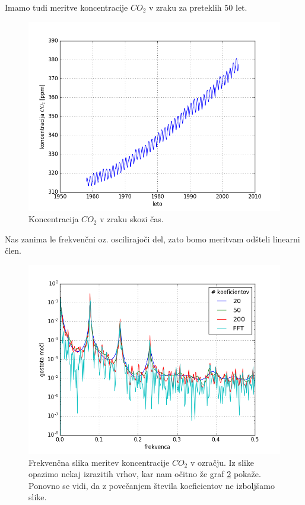 \documentclass[slovene,11pt,a4paper]{article}
\numberwithin{equation}{section} %
\numberwithin{figure}{section} %
\numberwithin{table}{section} %
\begin{document}
Imamo tudi meritve koncentracije $CO_2$ v zraku za preteklih $50$ let.
\begin{figure}[!htb]
\label{slika-co2}
\centering
\includegraphics[scale=0.5]{slike/co2_koncentracija.png}
\caption{Koncentracija $CO_2$ v zraku skozi čas.}
\end{figure}
Nas zanima le frekvenčni oz. oscilirajoči del, zato bomo meritvam odšteli linearni člen.

\begin{figure}[!htb]
\label{slika-co2}
\centering
\includegraphics[scale=0.5]{slike/co2_primerjava_koef.png}
\caption{Frekvenčna slika meritev koncentracije $CO_2$ v ozračju. Iz slike opazimo nekaj izrazitih vrhov, kar nam očitno že graf \ref{slika-co2} pokaže. Ponovno se vidi, da z povečanjem števila koeficientov ne izboljšamo slike.}
\end{figure}
\end{document}
